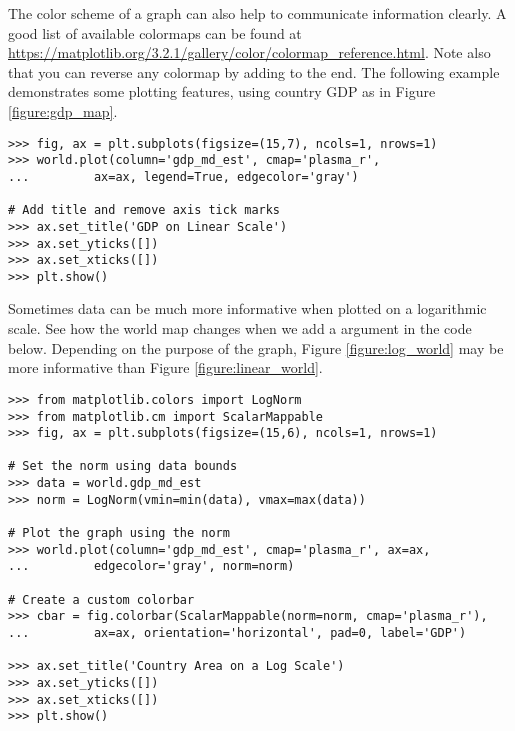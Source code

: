 The color scheme of a graph can also help to communicate information clearly.
A good list of available colormaps can be found at \url{https://matplotlib.org/3.2.1/gallery/color/colormap_reference.html}.
Note also that you can reverse any colormap by adding  to the end.
The following example demonstrates some plotting features, using country GDP as in Figure \ref{figure:gdp_map}.

\begin{lstlisting}
>>> fig, ax = plt.subplots(figsize=(15,7), ncols=1, nrows=1)
>>> world.plot(column='gdp_md_est', cmap='plasma_r', 
...			ax=ax, legend=True, edgecolor='gray')

# Add title and remove axis tick marks
>>> ax.set_title('GDP on Linear Scale')
>>> ax.set_yticks([])
>>> ax.set_xticks([])
>>> plt.show()
\end{lstlisting}


Sometimes data can be much more informative when plotted on a logarithmic scale.
See how the world map changes when we add a  argument in the code below.
Depending on the purpose of the graph, Figure \ref{figure:log_world} may be more informative than Figure \ref{figure:linear_world}.

\begin{lstlisting}
>>> from matplotlib.colors import LogNorm
>>> from matplotlib.cm import ScalarMappable
>>> fig, ax = plt.subplots(figsize=(15,6), ncols=1, nrows=1)

# Set the norm using data bounds
>>> data = world.gdp_md_est
>>> norm = LogNorm(vmin=min(data), vmax=max(data))

# Plot the graph using the norm
>>> world.plot(column='gdp_md_est', cmap='plasma_r', ax=ax,
...			edgecolor='gray', norm=norm)

# Create a custom colorbar
>>> cbar = fig.colorbar(ScalarMappable(norm=norm, cmap='plasma_r'), 
...			ax=ax, orientation='horizontal', pad=0, label='GDP')

>>> ax.set_title('Country Area on a Log Scale')
>>> ax.set_yticks([])
>>> ax.set_xticks([])
>>> plt.show()
\end{lstlisting}

